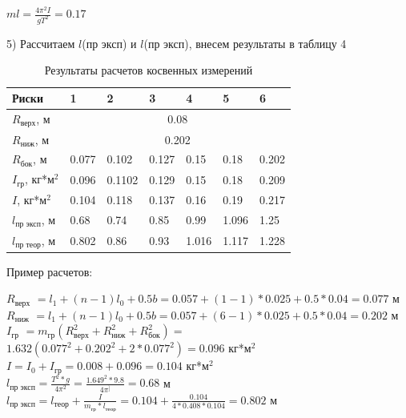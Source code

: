 \documentclass[14pt]{extreport}
\begin{document}
\begin{center}
    $ml = \frac{4\pi^{2}I}{gT^2} = 0.17$
\end{center}

5) Рассчитаем $l$(пр эксп) и $l$(пр эксп), внесем результаты в таблицу 4

\begin{table}[!ht]
    \centering
    \begin{tabular}{|l|l|l|l|l|l|l|}
    \hline
        Риски & 1 & 2 & 3 & 4 & 5 & 6  \\ \hline
        $R_\text{верх}$, м & \multicolumn{6}{c|}{0.08}   \\ \hline
        $R_\text{ниж}$, м & \multicolumn{6}{c|}{0.202}   \\ \hline
        $R_\text{бок}$, м & 0.077 & 0.102 & 0.127 & 0.15 & 0.18 & 0.202  \\ \hline
        $I_\text{гр}$, кг*м$^2$ & 0.096 & 0.1102 & 0.129 & 0.15 & 0.18 & 0.209  \\ \hline
        $I$, кг*м$^2$  & 0.104 & 0.118 & 0.137 & 0.16 & 0.19 & 0.217  \\ \hline
        $l_\text{пр эксп}$, м & 0.68 & 0.74 & 0.85 & 0.99 & 1.096 & 1.25  \\ \hline
        $l_\text{пр теор}$, м & 0.802 & 0.86 & 0.93 & 1.016 & 1.117 & 1.228 \\ \hline
    \end{tabular}
    \caption{Результаты расчетов косвенных измерений}
\end{table}
Пример расчетов:

\begin{center}
    $R_\text{верх}$ $= l_1 + (n-1)l_0 + 0.5b = 0.057 + (1 - 1)*0.025 + 0.5 * 0.04 = 0.077$ м \\
    $R_\text{ниж}$ $= l_1 + (n-1)l_0 + 0.5b = 0.057 + (6 - 1)*0.025 + 0.5 * 0.04 = 0.202$ м \\
    $I_\text{гр}$ $=m_\text{гр}(R_\text{верх}^2 + R_\text{ниж}^2 + R_\text{бок}^2)=$\\$ 1.632(0.077^2 + 0.202^2 + 2*0.077^2) = 0.096$ кг*м$^2$ \\
    $I = I_0 + I_\text{гр} = 0.008 + 0.096 = 0.104$ кг*м$^2$ \\
    $l_\text{пр эксп} = \frac{T^2 * g}{4\pi^2} = \frac{1.649^2 * 9.8}{4\pi^]} = 0.68$ м \\ 
     $l_\text{пр эксп}  = l_\text{теор} + \frac{I}{m_\text{гр}*l_\text{теор}} = 0.104 + \frac{0.104}{4*0.408 * 0.104} = 0.802$ м
\end{center}
\end{document}
